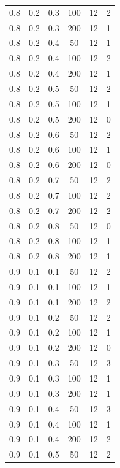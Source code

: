 \documentclass[a4paper,14pt, unknownkeysallowed]{extreport}
\begin{document}
\begin{center}
\begin{longtable}[c]{|c|c|c|c|c|c|}
	0.8 &  0.2 &  0.3 &  100 &    12 &     2 \\
	0.8 &  0.2 &  0.3 &  200 &    12 &     1 \\
   \hline
	0.8 &  0.2 &  0.4 &   50 &    12 &     1 \\
	0.8 &  0.2 &  0.4 &  100 &    12 &     2 \\
	0.8 &  0.2 &  0.4 &  200 &    12 &     1 \\
   \hline
	0.8 &  0.2 &  0.5 &   50 &    12 &     2 \\
	0.8 &  0.2 &  0.5 &  100 &    12 &     1 \\
	0.8 &  0.2 &  0.5 &  200 &    12 &     0 \\
   \hline
	0.8 &  0.2 &  0.6 &   50 &    12 &     2 \\
	0.8 &  0.2 &  0.6 &  100 &    12 &     1 \\
	0.8 &  0.2 &  0.6 &  200 &    12 &     0 \\
   \hline
	0.8 &  0.2 &  0.7 &   50 &    12 &     2 \\
	0.8 &  0.2 &  0.7 &  100 &    12 &     2 \\
	0.8 &  0.2 &  0.7 &  200 &    12 &     2 \\
   \hline
	0.8 &  0.2 &  0.8 &   50 &    12 &     0 \\
	0.8 &  0.2 &  0.8 &  100 &    12 &     1 \\
	0.8 &  0.2 &  0.8 &  200 &    12 &     1 \\
   \hline
	0.9 &  0.1 &  0.1 &   50 &    12 &     2 \\
	0.9 &  0.1 &  0.1 &  100 &    12 &     1 \\
	0.9 &  0.1 &  0.1 &  200 &    12 &     2 \\
   \hline
	0.9 &  0.1 &  0.2 &   50 &    12 &     2 \\
	0.9 &  0.1 &  0.2 &  100 &    12 &     1 \\
	0.9 &  0.1 &  0.2 &  200 &    12 &     0 \\
   \hline
	0.9 &  0.1 &  0.3 &   50 &    12 &     3 \\
	0.9 &  0.1 &  0.3 &  100 &    12 &     1 \\
	0.9 &  0.1 &  0.3 &  200 &    12 &     1 \\
   \hline
	0.9 &  0.1 &  0.4 &   50 &    12 &     3 \\
	0.9 &  0.1 &  0.4 &  100 &    12 &     1 \\
	0.9 &  0.1 &  0.4 &  200 &    12 &     2 \\
   \hline
	0.9 &  0.1 &  0.5 &   50 &    12 &     2 \\

\end{longtable}
\end{center}
\end{document}
